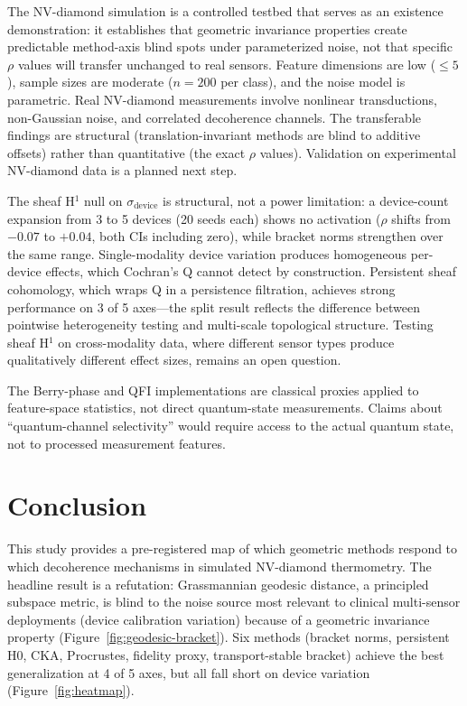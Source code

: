 \documentclass[11pt]{article}
\begin{document}
The NV-diamond simulation is a controlled testbed that serves as an
existence demonstration: it establishes that geometric invariance
properties create predictable method-axis blind spots under
parameterized noise, not that specific $\rho$ values will transfer
unchanged to real sensors.  Feature dimensions are low ($\leq 5$),
sample sizes are moderate ($n = 200$ per class), and the noise model
is parametric.  Real NV-diamond measurements involve nonlinear
transductions, non-Gaussian noise, and correlated decoherence channels.
The transferable findings are structural (translation-invariant methods
are blind to additive offsets) rather than quantitative (the exact
$\rho$ values).  Validation on experimental NV-diamond data is a
planned next step.

The sheaf H$^1$ null on $\sigma_\text{device}$ is structural, not a
power limitation: a device-count expansion from 3 to 5 devices (20
seeds each) shows no activation ($\rho$ shifts from $-0.07$ to
$+0.04$, both CIs including zero), while bracket norms strengthen
over the same range.  Single-modality device variation produces
homogeneous per-device effects, which Cochran's Q cannot detect by
construction.  Persistent sheaf cohomology, which wraps Q in a
persistence filtration, achieves strong performance on 3 of 5
axes---the split result reflects the difference between pointwise
heterogeneity testing and multi-scale topological structure.  Testing
sheaf H$^1$ on cross-modality data, where different sensor types
produce qualitatively different effect sizes, remains an open
question.

The Berry-phase and QFI implementations are classical proxies applied to
feature-space statistics, not direct quantum-state measurements.  Claims
about ``quantum-channel selectivity'' would require access to the actual
quantum state, not to processed measurement features.

\section{Conclusion}
\label{sec:conclusion}

This study provides a pre-registered map of which geometric methods
respond to which decoherence mechanisms in simulated NV-diamond
thermometry.  The headline result is a refutation: Grassmannian geodesic
distance, a principled subspace metric, is blind to the noise source
most relevant to clinical multi-sensor deployments (device calibration
variation) because of a geometric invariance property
(Figure~\ref{fig:geodesic-bracket}).  Six methods (bracket norms,
persistent H0, CKA, Procrustes, fidelity proxy, transport-stable
bracket) achieve the best generalization at 4 of 5 axes, but all fall
short on device variation (Figure~\ref{fig:heatmap}).
\end{document}
